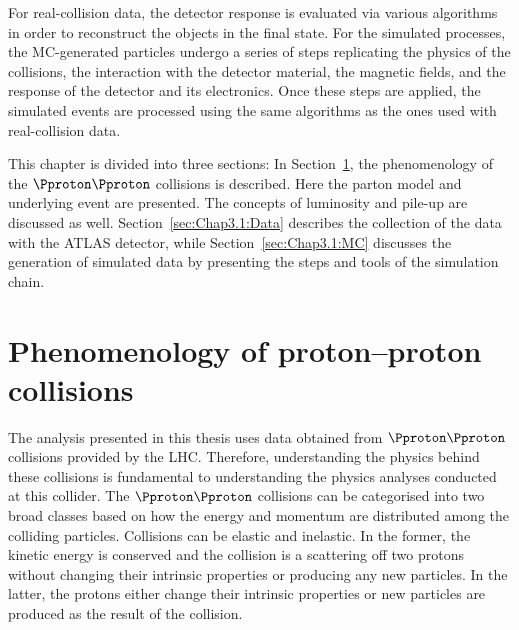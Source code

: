 For real-collision data, the detector response is evaluated via various algorithms
in order to reconstruct the objects in the final state.
For the simulated processes,
the MC-generated particles undergo a series of steps replicating the physics of
the collisions, the interaction with the detector material, the magnetic fields, and
the response of the detector and its electronics. Once these steps are applied,
the simulated events are processed using the same algorithms as the ones 
used with real-collision data. 


 This chapter is divided into three sections: In Section~\ref{sec:Chap2:PhenoOfPP}, the phenomenology of 
 the $\Pproton \Pproton$ collisions is described. Here the parton model and underlying
 event are presented. The concepts of luminosity and pile-up are discussed as well.
Section~\ref{sec:Chap3.1:Data} describes the collection of the 
 data with the ATLAS detector, while Section~\ref{sec:Chap3.1:MC}
 discusses the generation of simulated data by presenting the steps and tools
 of the simulation chain.


\section{Phenomenology of proton--proton collisions}
\label{sec:Chap2:PhenoOfPP}


The analysis presented in this thesis uses data obtained from $\Pproton\Pproton$ collisions 
provided by the LHC.
Therefore, understanding the physics behind these collisions is fundamental to understanding the physics
analyses conducted at this collider.
The $\Pproton\Pproton$ collisions can be categorised into two broad classes based on how 
the energy and momentum are distributed among the colliding particles. Collisions can be elastic and inelastic.
In the former, the kinetic energy is conserved and the collision is a scattering off 
two protons without changing their intrinsic properties or producing any new particles.
In the latter, the protons either change their intrinsic properties or new particles
are produced as the result of the collision.


